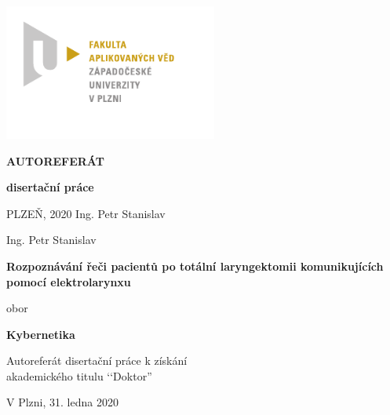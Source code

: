 \ifdefined\CELE
\else

\fi

\thispagestyle{empty}

\begin{flushright}
 \includegraphics[width=7cm]{./img/FAV_logo}
\end{flushright}
 \vspace{10mm}
\vspace{25mm}
\begin{center}
 {\LARGE{\textsf{\textbf{AUTOREFERÁT}}}}
\end{center}
\begin{center}
 {\LARGE{\textsf{\textbf{disertační práce}}}}
\end{center}
\vfill
\begin{flushleft}
 \Large{\textsf{PLZEŇ, 2020 \hfill Ing. Petr Stanislav}}
\end{flushleft}

\newpage\null\thispagestyle{empty}\newpage

\thispagestyle{empty}

\vspace{20pt}
\begin{center}
 \LARGE{\textsf{{Ing. Petr Stanislav}}}
\end{center}
\vspace{80pt}
\begin{center}
 \LARGE{\textsf{\textbf{Rozpoznávání řeči pacientů po totální laryngektomii komunikujících pomocí elektrolarynxu}}}
\end{center}
\vspace{40pt}
\begin{center}
 \LARGE{\textsf{obor}}
\end{center}
\begin{center}
 \LARGE{\textsf{\textbf{Kybernetika}}}
\end{center}
\vspace{60pt}
\begin{center}
 \LARGE{\textsf{Autoreferát disertační práce k získání \\ akademického titulu ‘‘Doktor''}}
\end{center}
\vfill
\begin{flushright}
 \LARGE{\textsf{V Plzni, 31. ledna 2020}}
\end{flushright}

